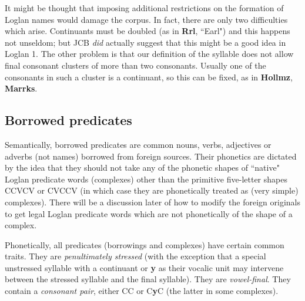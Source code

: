 \documentclass[12pt]{book}
\begin{document}
It might be thought that imposing additional restrictions on the formation of Loglan names would damage the corpus.  In fact, there are only two difficulties which arise.  Continuants must be doubled (as in {\bf Rrl}, ``Earl") and this happens not unseldom;  but JCB {\em did\/} actually suggest that this might be a good idea in Loglan 1.  The other problem is that our definition of the syllable does not allow final consonant clusters of more than two consonants.  Usually one of the consonants in such a cluster is a continuant, so this can be fixed, as in {\bf Hollmz}, {\bf Marrks}.

\subsection{Borrowed predicates}

Semantically, borrowed predicates are common nouns, verbs, adjectives or adverbs (not names) borrowed from foreign sources.  Their phonetics are dictated by the idea that they should not take any of the phonetic shapes of ``native" Loglan predicate words (complexes) other than the primitive five-letter shapes
CCVCV or CVCCV (in which case they are phonetically treated as (very simple) complexes).  There will be a discussion later of how to modify
the foreign originals to get legal Loglan predicate words which are not phonetically of the shape of a complex.

Phonetically, all predicates (borrowings and complexes) have certain common traits.  They are {\em penultimately stressed\/} (with the exception that a special unstressed syllable with a continuant or {\bf y} as their vocalic unit may intervene between the stressed syllable and the final syllable).  They are {\em vowel-final\/}.  They contain a {\em consonant pair\/}, either CC or C{\bf y}C (the latter in some complexes).
\end{document}
